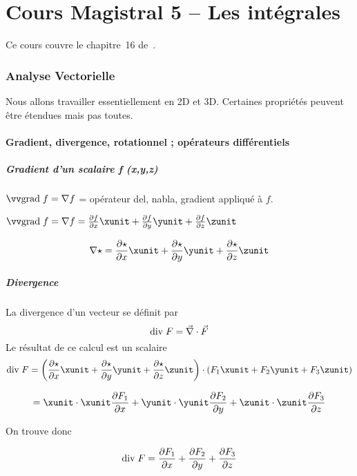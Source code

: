 \part{Cours Magistral 5 -- Les intégrales}
Ce cours couvre le chapitre~16 de~\cite{adams2013calculus}.

\section{Analyse Vectorielle}


Nous allons travailler essentiellement en 2D et 3D. Certaines propriétés peuvent être étendues mais pas toutes.%

\subsection{Gradient, divergence, rotationnel ; opérateurs différentiels}
\subsubsection{Gradient d'un scalaire f (x,y,z)}

$\gradt f = \nabla f$ = opérateur \og del\fg{}, \og nabla\fg{}, \og gradient\fg{} appliqué à $f$.

$\gradt f = \nabla f =\frac{\partial f}{\partial x} \xunit +\frac{\partial f}{\partial y} \yunit +\frac{\partial f}{\partial z} \zunit$

\[\nabla \star = \frac{\partial \star}{\partial x} \xunit +\frac{\partial \star}{\partial y} \yunit +\frac{\partial \star}{\partial z} \zunit\]
\subsubsection{Divergence}
\begin{mydef}
La divergence d'un vecteur se définit par
\[\mathrm{div}\; F = \vec \nabla \cdot \vec F\]
Le résultat de ce calcul est un scalaire
\[\divt F = \left( \frac{\partial \star}{\partial x} \xunit +\frac{\partial \star}{\partial y} \yunit +\frac{\partial \star}{\partial z} \zunit \right) \cdot (F_1 \xunit +F_2 \yunit +F_3 \zunit) \]

\[= \xunit\cdot \xunit \frac{\partial F_1}{\partial x}+\yunit\cdot \yunit \frac{\partial F_2}{\partial y}+\zunit\cdot\zunit \frac{\partial F_3}{\partial z}  \]

On trouve donc

\[\mathrm{div}\; F = \frac{\partial F_1}{\partial x}+\frac{\partial F_2}{\partial y}+\frac{\partial F_3}{\partial z}\]
\end{mydef}

